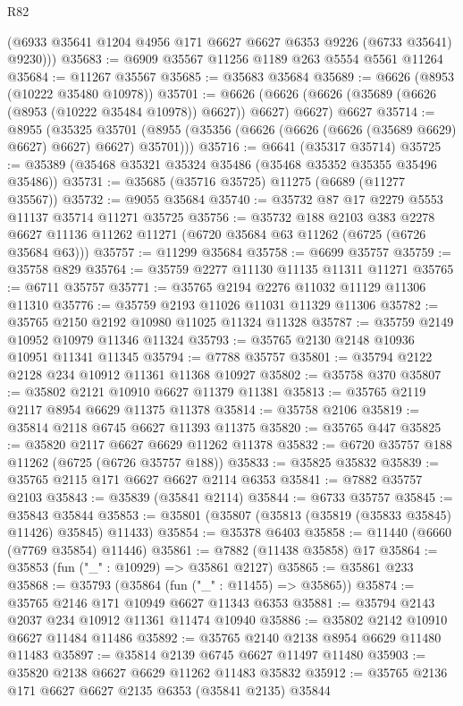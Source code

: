 \begin{lexlean}{R82}
\begin{coremodule}
        (@6933 @35641 @1204 @4956 @171 @6627 @6627 @6353 @9226 (@6733 @35641) @9230)))
@35683 := @6909 @35567 @11256 @1189 @263 @5554 @5561 @11264
@35684 := @11267 @35567
@35685 := @35683 @35684
@35689 := @6626 (@8953 (@10222 @35480 @10978))
@35701 := @6626
    (@6626 (@6626 (@35689 (@6626 (@8953 (@10222 @35484 @10978)) @6627)) @6627) @6627)
    @6627
@35714 := @8955
    (@35325 @35701 (@8955 (@35356 (@6626 (@6626 (@6626 (@35689 @6629) @6627) @6627) @6627) @35701)))
@35716 := @6641 (@35317 @35714)
@35725 := @35389 (@35468 @35321 @35324 @35486 (@35468 @35352 @35355 @35496 @35486))
@35731 := @35685 (@35716 @35725) @11275 (@6689 (@11277 @35567))
@35732 := @9055 @35684
@35740 := @35732 @87 @17 @2279 @5553 @11137 @35714 @11271 @35725
@35756 := @35732
    @188
    @2103
    @383
    @2278
    @6627
    @11136
    @11262
    @11271
    (@6720 @35684 @63 @11262 (@6725 (@6726 @35684 @63)))
@35757 := @11299 @35684
@35758 := @6699 @35757
@35759 := @35758 @829
@35764 := @35759 @2277 @11130 @11135 @11311 @11271
@35765 := @6711 @35757
@35771 := @35765 @2194 @2276 @11032 @11129 @11306 @11310
@35776 := @35759 @2193 @11026 @11031 @11329 @11306
@35782 := @35765 @2150 @2192 @10980 @11025 @11324 @11328
@35787 := @35759 @2149 @10952 @10979 @11346 @11324
@35793 := @35765 @2130 @2148 @10936 @10951 @11341 @11345
@35794 := @7788 @35757
@35801 := @35794 @2122 @2128 @234 @10912 @11361 @11368 @10927
@35802 := @35758 @370
@35807 := @35802 @2121 @10910 @6627 @11379 @11381
@35813 := @35765 @2119 @2117 @8954 @6629 @11375 @11378
@35814 := @35758 @2106
@35819 := @35814 @2118 @6745 @6627 @11393 @11375
@35820 := @35765 @447
@35825 := @35820 @2117 @6627 @6629 @11262 @11378
@35832 := @6720 @35757 @188 @11262 (@6725 (@6726 @35757 @188))
@35833 := @35825 @35832
@35839 := @35765 @2115 @171 @6627 @6627 @2114 @6353
@35841 := @7882 @35757 @2103
@35843 := @35839 (@35841 @2114)
@35844 := @6733 @35757
@35845 := @35843 @35844
@35853 := @35801 (@35807 (@35813 (@35819 (@35833 @35845) @11426) @35845) @11433)
@35854 := @35378 @6403
@35858 := @11440 (@6660 (@7769 @35854) @11446)
@35861 := @7882 (@11438 @35858) @17
@35864 := @35853 (fun ("_" : @10929) => @35861 @2127)
@35865 := @35861 @233
@35868 := @35793 (@35864 (fun ("_" : @11455) => @35865))
@35874 := @35765 @2146 @171 @10949 @6627 @11343 @6353
@35881 := @35794 @2143 @2037 @234 @10912 @11361 @11474 @10940
@35886 := @35802 @2142 @10910 @6627 @11484 @11486
@35892 := @35765 @2140 @2138 @8954 @6629 @11480 @11483
@35897 := @35814 @2139 @6745 @6627 @11497 @11480
@35903 := @35820 @2138 @6627 @6629 @11262 @11483 @35832
@35912 := @35765 @2136 @171 @6627 @6627 @2135 @6353 (@35841 @2135) @35844

\end{coremodule}
\end{lexlean}
